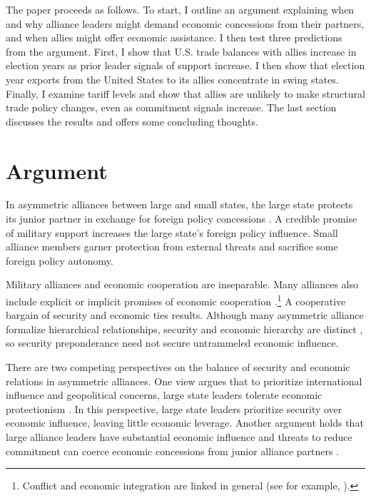 \documentclass[12pt]{article}
\begin{document}
The paper proceeds as follows. 
To start, I outline an argument explaining when and why alliance leaders might demand economic concessions from their partners, and when allies might offer economic assistance. 
I then test three predictions from the argument. 
First, I show that U.S. trade balances with allies increase in election years as prior leader signals of support increase. 
I then show that election year exports from the United States to its allies concentrate in swing states. 
Finally, I examine tariff levels and show that allies are unlikely to make structural trade policy changes, even as commitment signals increase. 
The last section discusses the results and offers some concluding thoughts.


\section{Argument}


In asymmetric alliances between large and small states, the large state protects its junior partner in exchange for foreign policy concessions \citep{Morrow1991}.
A credible promise of military support increases the large state's foreign policy influence. 
Small alliance members garner protection from external threats and sacrifice some foreign policy autonomy. 


Military alliances and economic cooperation are inseparable.
Many alliances also include explicit or implicit promises of economic cooperation \citep{GowaMansfield2004, LongLeeds2006, Davis2008, Poast2012}.\footnote{Conflict and economic integration are linked in general (see for example, \citep{GartzkeLi2003, Chen2021}).}
A cooperative bargain of security and economic ties results. 
Although many asymmetric alliance formalize hierarchical relationships, security and economic hierarchy are distinct \citep{Lake2009}, so security preponderance need not secure untrammeled economic influence. 


There are two competing perspectives on the balance of security and economic relations in asymmetric alliances.
One view argues that to prioritize international influence and geopolitical concerns, large state leaders tolerate economic protectionism \citep{Drezner2013, WolfordKim2017}. 
In this perspective, large state leaders prioritize security over economic influence, leaving little economic leverage. 
Another argument holds that large alliance leaders have substantial economic influence \citep{Norrlof2010, Brooksetal2013} and threats to reduce commitment can coerce economic concessions from junior alliance partners \citep{Oatley2015}.  
\end{document}
